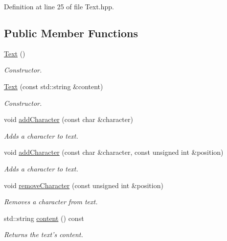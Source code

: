 Definition at line 25 of file Text.hpp.\subsection*{Public Member Functions}
\begin{CompactItemize}
\item 
\hyperlink{class_text_b3e26143fccc52699bcc5149cae852bc}{Text} ()
\begin{CompactList}\small\item\em Constructor. \item\end{CompactList}\item 
\hyperlink{class_text_d8c7b52db022f4351e31b2b7609a8180}{Text} (const std::string \&content)
\begin{CompactList}\small\item\em Constructor. \item\end{CompactList}\item 
void \hyperlink{class_text_6e6da63c90af68639adc7dd1336f6bf9}{addCharacter} (const char \&character)
\begin{CompactList}\small\item\em Adds a character to text. \item\end{CompactList}\item 
void \hyperlink{class_text_fdd11ad0c90ca483d4cff3d74a64da9e}{addCharacter} (const char \&character, const unsigned int \&position)
\begin{CompactList}\small\item\em Adds a character to text. \item\end{CompactList}\item 
void \hyperlink{class_text_e04500eeada2a4a3bb00554b32263c52}{removeCharacter} (const unsigned int \&position)
\begin{CompactList}\small\item\em Removes a character from text. \item\end{CompactList}\item 
std::string \hyperlink{class_text_58a34fa2cfd0c240a7517132017b6a83}{content} () const 
\begin{CompactList}\small\item\em Returns the text's content. \item\end{CompactList}\item 

\end{CompactItemize}
